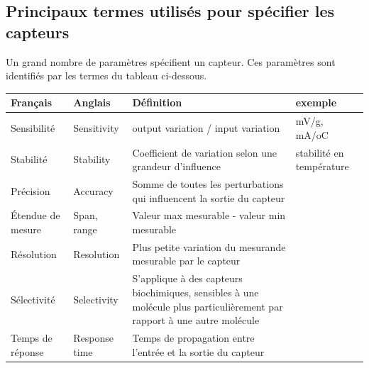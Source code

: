 \subsection{Principaux termes utilisés pour spécifier les capteurs}

Un grand nombre de paramètres spécifient un capteur. Ces paramètres sont identifiés par les termes du tableau ci-dessous.
\begin {center}
\begin{tabular}{|p{2.2cm}|p{2.8cm}|p{6.8cm}|p{2.4cm}|}
    \hline
    \textbf{Français}            & \textbf{Anglais}         & \textbf{Définition}                                                                                                     & \textbf{exemple}                \\
    \hline
    \hline
    Sensibilité                  & Sensitivity              & output variation / input variation                                                                                      & mV/g, mA/oC                     \\
    \hline
    Stabilité                    & Stability                & Coefficient de variation selon une grandeur d'influence                                                                 & stabilité en température        \\
    \hline
    Précision                    & Accuracy                 & Somme de toutes les perturbations qui influencent la sortie du capteur                                                  &                                 \\
    \hline
    Étendue de mesure            & Span, range              & Valeur max mesurable - valeur min mesurable                                                                             &                                 \\
    \hline
    Résolution                   & Resolution               & Plus petite variation du mesurande mesurable par le capteur                                                             &                                 \\
    \hline
    Sélectivité                  & Selectivity              & S'applique à des capteurs biochimiques, sensibles à une molécule plus particulièrement par rapport à une autre molécule &                                 \\
    \hline
    Temps de réponse             & Response time            & Temps de propagation entre l'entrée et la sortie du capteur                                                             &                                 \\

\end{tabular}
\end{center}
